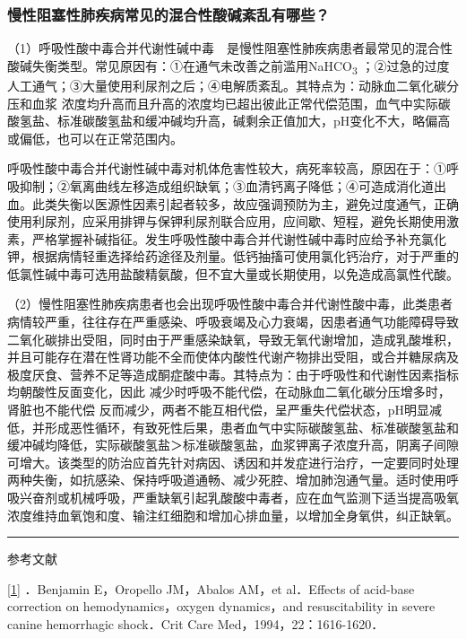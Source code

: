 \subsubsection{慢性阻塞性肺疾病常见的混合性酸碱紊乱有哪些？}

（1）呼吸性酸中毒合并代谢性碱中毒　是慢性阻塞性肺疾病患者最常见的混合性酸碱失衡类型。常见原因有：①在通气未改善之前滥用NaHCO\textsubscript{3}
；②过急的过度人工通气；③大量使用利尿剂之后；④电解质紊乱。其特点为：动脉血二氧化碳分压和血浆
浓度均升高而且升高的浓度均已超出彼此正常代偿范围，血气中实际碳酸氢盐、标准碳酸氢盐和缓冲碱均升高，碱剩余正值加大，pH变化不大，略偏高或偏低，也可以在正常范围内。

呼吸性酸中毒合并代谢性碱中毒对机体危害性较大，病死率较高，原因在于：①呼吸抑制；②氧离曲线左移造成组织缺氧；③血清钙离子降低；④可造成消化道出血。此类失衡以医源性因素引起者较多，故应强调预防为主，避免过度通气，正确使用利尿剂，应采用排钾与保钾利尿剂联合应用，应间歇、短程，避免长期使用激素，严格掌握补碱指征。发生呼吸性酸中毒合并代谢性碱中毒时应给予补充氯化钾，根据病情轻重选择给药途径及剂量。低钙抽搐可使用氯化钙治疗，对于严重的低氯性碱中毒可选用盐酸精氨酸，但不宜大量或长期使用，以免造成高氯性代酸。

（2）慢性阻塞性肺疾病患者也会出现呼吸性酸中毒合并代谢性酸中毒，此类患者病情较严重，往往存在严重感染、呼吸衰竭及心力衰竭，因患者通气功能障碍导致二氧化碳排出受阻，同时由于严重感染缺氧，导致无氧代谢增加，造成乳酸堆积，并且可能存在潜在性肾功能不全而使体内酸性代谢产物排出受阻，或合并糖尿病及极度厌食、营养不足等造成酮症酸中毒。其特点为：由于呼吸性和代谢性因素指标均朝酸性反面变化，因此
减少时呼吸不能代偿，在动脉血二氧化碳分压增多时，肾脏也不能代偿
反而减少，两者不能互相代偿，呈严重失代偿状态，pH明显减低，并形成恶性循环，有致死性后果，患者血气中实际碳酸氢盐、标准碳酸氢盐和缓冲碱均降低，实际碳酸氢盐＞标准碳酸氢盐，血浆钾离子浓度升高，阴离子间隙可增大。该类型的防治应首先针对病因、诱因和并发症进行治疗，一定要同时处理两种失衡，如抗感染、保持呼吸道通畅、减少死腔、增加肺泡通气量。适时使用呼吸兴奋剂或机械呼吸，严重缺氧引起乳酸酸中毒者，应在血气监测下适当提高吸氧浓度维持血氧饱和度、输注红细胞和增加心排血量，以增加全身氧供，纠正缺氧。

\begin{center}\rule{0.5\linewidth}{\linethickness}\end{center}

参考文献

\protect\hyperlink{text00026.htmlux5cux23ch1-25-back}{{[}1{]}}
．Benjamin E，Oropello JM，Abalos AM，et al．Effects of acid-base
correction on hemodynamics，oxygen dynamics，and resuscitability in
severe canine hemorrhagic shock．Crit Care Med，1994，22：1616-1620．

